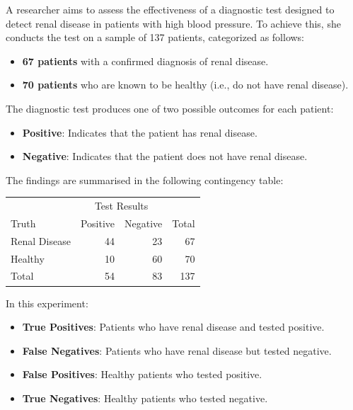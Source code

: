 \begin{example}
    A researcher aims to assess the effectiveness of a diagnostic test designed to detect renal disease in patients with high blood pressure. To achieve this, she conducts the test on a sample of 137 patients, categorized as follows:

\begin{itemize}
    \item \textbf{67 patients} with a confirmed diagnosis of renal disease.
    \item \textbf{70 patients} who are known to be healthy (i.e., do not have renal disease).
\end{itemize}

The diagnostic test produces one of two possible outcomes for each patient:

\begin{itemize}
    \item \textbf{Positive}: Indicates that the patient has renal disease.
    \item \textbf{Negative}: Indicates that the patient does not have renal disease.
\end{itemize}

The findings are summarised in the following contingency table:

    \begin{tabular}{lrrr}
        & \multicolumn{2}{c}{ Test Results } & \\
        Truth & Positive & Negative & Total \\
        Renal Disease & 44 & 23 & 67 \\
        Healthy & 10 & 60 & 70 \\
        Total & 54 & 83 & 137
        \end{tabular}

    In this experiment:


        \begin{itemize}
            \item \textbf{True Positives}: Patients who have renal disease and tested positive.
            \item \textbf{False Negatives}: Patients who have renal disease but tested negative.
            \item \textbf{False Positives}: Healthy patients who tested positive.
            \item \textbf{True Negatives}: Healthy patients who tested negative.
        \end{itemize}


\end{example}
